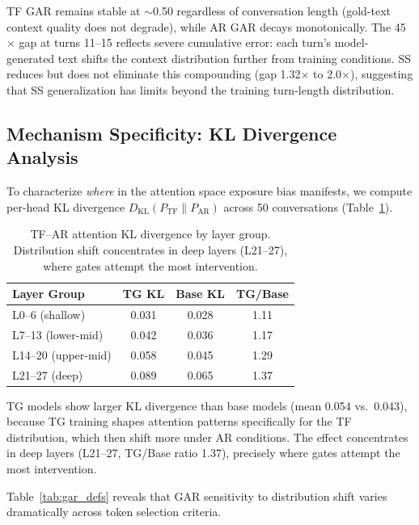 \documentclass[11pt,a4paper]{article}
\begin{document}
TF GAR remains stable at $\sim$0.50 regardless of conversation length (gold-text context quality does not degrade), while AR GAR decays monotonically. The 45$\times$ gap at turns 11--15 reflects severe cumulative error: each turn's model-generated text shifts the context distribution further from training conditions. SS reduces but does not eliminate this compounding (gap 1.32$\times$ to 2.0$\times$), suggesting that SS generalization has limits beyond the training turn-length distribution.

\subsection{Mechanism Specificity: KL Divergence Analysis}

To characterize \emph{where} in the attention space exposure bias manifests, we compute per-head KL divergence $D_{\text{KL}}(P_{\text{TF}} \| P_{\text{AR}})$ across 50 conversations (Table~\ref{tab:kl}).

\begin{table}[t]
\centering
\small
\caption{TF--AR attention KL divergence by layer group. Distribution shift concentrates in deep layers (L21--27), where gates attempt the most intervention.}
\label{tab:kl}
\begin{tabular}{@{}lccc@{}}
\toprule
Layer Group & TG KL & Base KL & TG/Base \\
\midrule
L0--6 (shallow) & 0.031 & 0.028 & 1.11 \\
L7--13 (lower-mid) & 0.042 & 0.036 & 1.17 \\
L14--20 (upper-mid) & 0.058 & 0.045 & 1.29 \\
L21--27 (deep) & 0.089 & 0.065 & 1.37 \\
\bottomrule
\end{tabular}
\end{table}

TG models show larger KL divergence than base models (mean 0.054 vs.\ 0.043), because TG training shapes attention patterns specifically for the TF distribution, which then shift more under AR conditions. The effect concentrates in deep layers (L21--27, TG/Base ratio 1.37), precisely where gates attempt the most intervention.

Table~\ref{tab:gar_defs} reveals that GAR sensitivity to distribution shift varies dramatically across token selection criteria.
\end{document}
